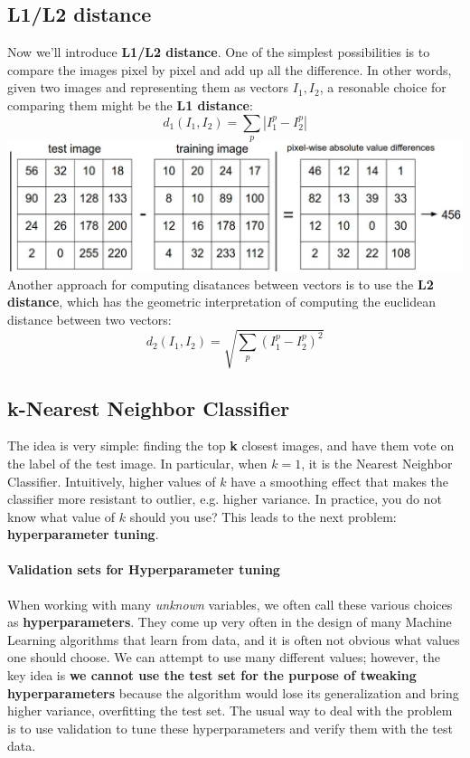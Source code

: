 \documentclass{article}
\begin{document}
\subsection{L1/L2 distance}
Now we'll introduce \textbf{L1/L2 distance}. One of the simplest possibilities is to compare the images pixel by pixel and add up all the difference. In other words, given two images and representing them as vectors $I_1, I_2$, a resonable choice for comparing them might be the \textbf{L1 distance}:
\begin{equation*}
	d_1(I_1,I_2) = \sum_{p}|I_1^p-I_2^p|
\end{equation*}
\includegraphics[scale=0.4]{images/l1distance.jpg}
Another approach for computing disatances between vectors is to use the \textbf{L2 distance}, which has the geometric interpretation of computing the euclidean distance between two vectors:
\begin{equation*}
    d_2(I_1,I_2) = \sqrt{\sum_{p}\left(I_1^p-I_2^p\right)^2}
\end{equation*}

\subsection{k-Nearest Neighbor Classifier}
The idea is very simple: finding the top \textbf{k} closest images, and have them vote on the label of the test image. In particular, when $k = 1$, it is the Nearest Neighbor Classifier. Intuitively, higher values of $k$ have a smoothing effect that makes the classifier more resistant to outlier, e.g. higher variance. In practice, you do not know what value of $k$ should you use? This leads to the next problem: \textbf{hyperparameter tuning}.

\paragraph{Validation sets for Hyperparameter tuning}
When working with many \textit{unknown} variables, we often call these various choices as \textbf{hyperparameters}. They come up very often in the design of many Machine Learning algorithms that learn from data, and it is often not obvious what values one should choose. We can attempt to use many different values; however, the key idea is \textbf{we cannot use the test set for the purpose of tweaking hyperparameters} because the algorithm would lose its generalization and bring higher variance, overfitting the test set. The usual way to deal with the problem is to use validation to tune these hyperparameters and verify them with the test data.
\end{document}

